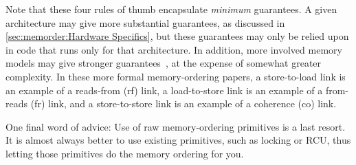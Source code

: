 Note that these four rules of thumb encapsulate \emph{minimum} guarantees.
A given architecture may give more substantial guarantees, as discussed
in \cref{sec:memorder:Hardware Specifics}, but these guarantees may only
be relied upon in code that runs only for that architecture.
In addition, more involved memory models may give stronger
guarantees~\cite{Alglave:2018:FSC:3173162.3177156}, at the
expense of somewhat greater complexity.
In these more formal memory-ordering papers, a store-to-load link is an
example of a reads-from (rf) link, a load-to-store link is an example
of a from-reads (fr) link, and a store-to-store link is an example of
a coherence (co) link.

One final word of advice:
Use of raw memory-ordering primitives is a last resort.
It is almost always better to use existing primitives, such as locking
or RCU, thus letting those primitives do the memory ordering for you.

